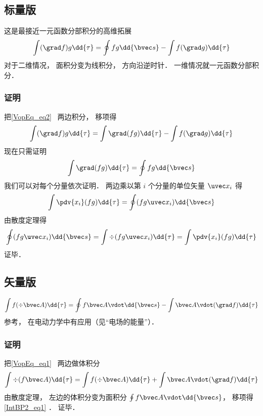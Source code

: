 
\begin{issues}
\issueDraft
\end{issues}


\subsection{标量版}
这是最接近一元函数分部积分的高维拓展
\begin{equation}
\int (\grad f) g \dd{\tau} = \oint fg \dd{\bvec s} - \int f (\grad g) \dd{\tau}
\end{equation}
对于二维情况， 面积分变为线积分， 方向沿逆时针． 一维情况就一元函数分部积分．

\subsubsection{证明}
把\autoref{VopEq_eq2}~ 两边积分， 移项得
\begin{equation}
\int (\grad f) g \dd{\tau} = \int \grad (fg) \dd{\tau} - \int f (\grad g) \dd{\tau}
\end{equation}
现在只需证明
\begin{equation}
\int \grad (fg) \dd{\tau} = \oint fg \dd{\bvec s}
\end{equation}
我们可以对每个分量依次证明． 两边乘以第 $i$ 个分量的单位矢量 $\uvec x_i$ 得
\begin{equation}
\int \pdv{x_i}(fg) \dd{\tau} = \oint (fg\uvec x_i) \dd{\bvec s}
\end{equation}
由散度定理得
\begin{equation}
\oint (fg\uvec x_i) \dd{\bvec s} = \int \div (fg\uvec x_i) \dd{\tau} = \int \pdv{x_i}(fg) \dd{\tau}
\end{equation}
证毕．

\subsection{矢量版}
\begin{equation}\label{IntBP2_eq1}
\int f (\div \bvec A)\dd{\tau} =  \oint f \bvec A \vdot \dd{\bvec s} - \int\bvec A \vdot (\grad f)\dd{\tau}
\end{equation}
参考\cite{GriffE}， 在电动力学中有应用（见“电场的能量”）．

\subsubsection{证明}
把\autoref{VopEq_eq1}~ 两边做体积分
\begin{equation}
\int\div (f \bvec A) \dd{\tau} = \int f (\div \bvec A)\dd{\tau} + \int\bvec A \vdot (\grad f)\dd{\tau}
\end{equation}
由散度定理， 左边的体积分变为面积分 $\oint f \bvec A \vdot \dd{\bvec s}$， 移项得\autoref{IntBP2_eq1} ． 证毕．
